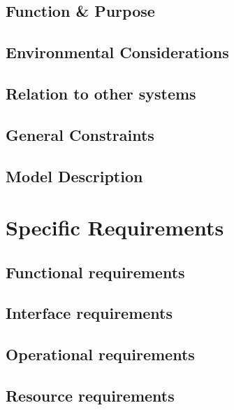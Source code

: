   \subsection{Function \& Purpose}
    \label{sec:function_&_purpose}
    
  \subsection{Environmental Considerations}
    \label{sec:environmental_considerations}
    
  \subsection{Relation to other systems}
    \label{sec:relation_to_other_systems}
    
  \subsection{General Constraints}
    \label{sec:general_constraints}
    
  \subsection{Model Description}
    \label{sec:model_description}
    

\section{Specific Requirements} %
  \label{sec:specific_requirements}
  \subsection{Functional requirements}
    \label{sec:functional_requirements}
    
  \subsection{Interface requirements}
    \label{sec:interface_requirements}
    
  \subsection{Operational requirements}
    \label{sec:operational_requirements}
    
  \subsection{Resource requirements}
    \label{sec:resource_requirements}
    
